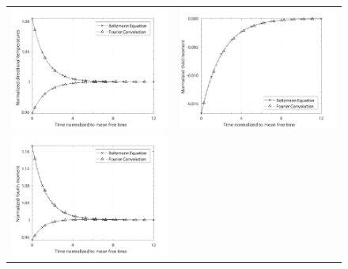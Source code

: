\documentclass[12pt]{CSUNthesis}
\begin{document}
\begin{center}
\begin{figure}[h]
\centering
  \begin{tabular}{@{}cc@{}}
  \includegraphics[height=.218\textheight]{images/m155_15N_mom2.pdf}&
  \includegraphics[height=.218\textheight]{images/m155_15N_mom3.pdf}\\      
  \includegraphics[height=.218\textheight]{images/m155_15N_mom4.pdf}&

\end{tabular}
\end{figure}
\end{center}
\end{document}
